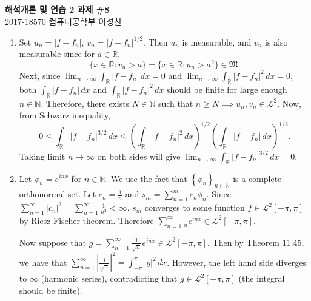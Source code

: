 \documentclass[12pt]{report}
\newcommand{\numl}[1]{\item[\large\textbf{\sffamily #1.}]}
\newcommand{\mf}[1]{\mathfrak{#1}}
\newcommand{\mc}[1]{\mathcal{#1}}
\newcommand{\abs}[1]{\left| #1 \right|}
\newcommand{\paren}[1]{\left( #1 \right)}
\newcommand{\seq}[1]{\left\{ #1 \right\}}
\newcommand{\ra}{\rightarrow}
\newcommand{\R}{\mathbb{R}}
\newcommand{\N}{\mathbb{N}}
\renewcommand{\d}[1]{\,d{#1}}
\begin{document}
\begin{center}
    \textbf{\Large 해석개론 및 연습 2 과제 \#8}\\
    \large 2017-18570 컴퓨터공학부 이성찬
\end{center}
\begin{enumerate}

    \numl{1} Set \(u_n = \abs{f - f_n}\), \(v_n = \abs{f - f_n}^{1/2}\). Then \(u_n\) is measurable, and \(v_n\) is also measurable since for \(a \in \R\),
    \[
        \{x \in \R : v_n > a\} = \{x \in \R : u_n > a^2\} \in \mf{M}.
    \]
    Next, since \(\lim_{n \ra \infty} \int_\R \abs{f - f_n} \d{x}= 0\) and \(\lim_{n \ra \infty} \int_\R \abs{f - f_n}^2 \d{x}= 0\), both \(\int_\R \abs{f - f_n} \d{x}\) and \(\int_\R \abs{f - f_n}^2 \d{x}\) should be finite for large enough \(n \in \N\). Therefore, there exists \(N \in \N\) such that \(n \geq N \implies u_n, v_n \in \mc{L}^{2}\). Now, from Schwarz inequality,
    \[
        0 \leq \int_\R \abs{f - f_n}^{3/2} \d{x} \leq \paren{\int_\R \abs{f - f_n}^2 \d{x}}^{1/2} \paren{\int_\R \abs{f - f_n} \d{x}}^{1/2}.
    \]
    Taking limit \(n \ra \infty\) on both sides will give \(\lim_{n \ra \infty} \int_\R \abs{f - f_n}^{3/2} \d{x} = 0\).

    \numl{2} Let \(\phi_n = e^{inx}\) for \(n \in \N\). We use the fact that \(\seq{\phi_n}_{n\in \N}\) is a complete orthonormal set. Let \(c_n = \frac{1}{n}\) and \(s_m = \sum_{n=1}^{m} c_n \phi_n\). Since \(\sum_{n=1}^{\infty}\abs{c_n}^2 = \sum_{n=1}^{\infty} \frac{1}{n^2} < \infty\), \(s_m\) converges to some function \(f \in \mc{L}^{2}[-\pi, \pi]\) by Riesz-Fischer theorem. Therefore \(\sum_{n=1}^{\infty} \frac{1}{n}e^{inx} \in \mc{L}^{2}[-\pi, \pi]\).

    Now suppose that \(g = \sum_{n=1}^{\infty} \frac{1}{\sqrt{n}} e^{inx} \in \mc{L}^{2}[-\pi, \pi]\). Then by {\sffamily Theorem 11.45}, we have that \(\sum_{n=1}^{\infty} \abs{\frac{1}{\sqrt{n}}}^2 = \int_{-\pi}^{\pi} \abs{g}^2 \d{x}\). However, the left hand side diverges to \(\infty\) (harmonic series), contradicting that \(g \in \mc{L}^{2}[-\pi, \pi]\) (the integral should be finite).


\end{enumerate}
\end{document}
